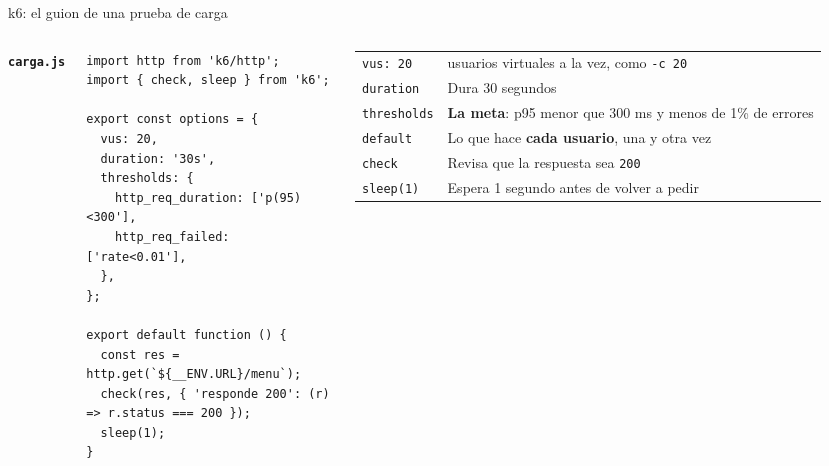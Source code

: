 \documentclass[aspectratio=169,10pt,c]{beamer}
\begin{document}
\begin{frame}[fragile]{k6: el guion de una prueba de carga}
\begin{columns}[T,onlytextwidth]
\textbf{\scriptsize\texttt{carga.js}}
\begin{lstlisting}
import http from 'k6/http';
import { check, sleep } from 'k6';

export const options = {
  vus: 20,
  duration: '30s',
  thresholds: {
    http_req_duration: ['p(95)<300'],
    http_req_failed: ['rate<0.01'],
  },
};

export default function () {
  const res = http.get(`${__ENV.URL}/menu`);
  check(res, { 'responde 200': (r) => r.status === 200 });
  sleep(1);
}
\end{lstlisting}
\renewcommand{\arraystretch}{1.2}
\small
\begin{tabular}{@{}>{\raggedright\arraybackslash}p{1.9cm}>{\raggedright\arraybackslash}p{3.9cm}@{}}
\toprule
\texttt{vus: 20} & 20 usuarios virtuales a la vez, como \texttt{-c 20}\\
\texttt{duration} & Dura 30 segundos\\
\texttt{thresholds} & \textbf{La meta}: p95 menor que 300 ms y menos de 1\% de errores\\
\texttt{default} & Lo que hace \textbf{cada usuario}, una y otra vez\\
\texttt{check} & Revisa que la respuesta sea \texttt{200}\\
\texttt{sleep(1)} & Espera 1 segundo antes de volver a pedir\\
\bottomrule
\end{tabular}
\end{columns}
\end{frame}
\end{document}
